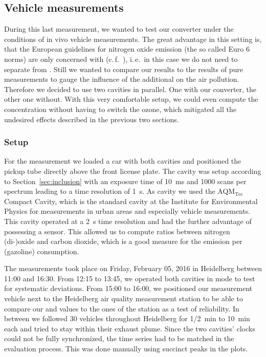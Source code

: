 \subsection{Vehicle measurements}
\label{sec:vehicle}

During this last measurement, we wanted to test our converter under
the conditions of in vivo vehicle measurements. The great advantage in
this setting is, that the European guidelines for nitrogen oxide
emission (the so called Euro 6 norms) are only concerned with 
(c.\,f.~\cite{eu}), i.\,e.\ in this case we do not need to separate
 from . Still we wanted to compare our 
results to the results of pure  measurements to gauge the
influence of the additional  on the air pollution. Therefore we
decided to use two cavities in parallel. One with our converter, the
other one without. With this very comfortable setup, we could even
compute the  concentration without having to switch the ozone,
which mitigated all the undesired effects described in the previous
two sections.

\subsubsection{Setup}
\label{sec:vehicle-setup}

For the measurement we loaded a car with both cavities
and positioned the pickup tube directly above the front license
plate. The  cavity was setup according to
Section~\ref{sec:inclusion} with an exposure time of
\SI{10}{\milli\second} and 1000 scans per spectrum leading to a time
resolution of \SI{1}{\second}. As  cavity we used the
AQM$_{\text{Tec}}$ Compact Cavity, which is the standard cavity at the
Institute for Environmental Physics for  measurements in urban
areas and especially vehicle measurements. This cavity operated at a
\SI{2}{\second} time resolution and had the further advantage of
possessing a  sensor. This allowed us to compute ratios
between nitrogen (di-)oxide and carbon dioxide, which is a good
measure for the emission per (gazoline) consumption.

The measurements took place on Friday, February 05, 2016 in Heidelberg
between 11:00 and 16:30. From 12:15 to 13:45, we operated both
cavities in  mode to test for systematic deviations. From
15:00 to 16:00, we positioned our measurement vehicle next to the
Heidelberg air quality measurement station to be able to compare our
 and  values to the ones of the station as a test of
reliability. In between we followed 30 vehicles throughout
Heidelberg for {\nfrac{} 1/2}~\si{\minute} to \SI{10}{\minute} each
and tried to stay within their exhaust plume. Since the two cavities'
clocks could not be fully synchronized, the time series had to be
matched in the evaluation process. This was done manually using succinct
peaks in the plots.

